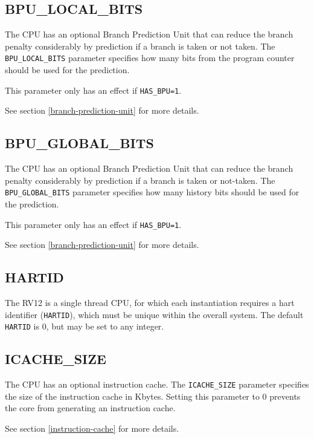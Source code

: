 \subsection{BPU\_LOCAL\_BITS}\label{bpu_local_bits}

The CPU has an optional Branch Prediction Unit that can reduce the
branch penalty considerably by prediction if a branch is taken or not
taken. The \texttt{BPU\_LOCAL\_BITS} parameter specifies how many bits from the
program counter should be used for the prediction.

This parameter only has an effect if \texttt{HAS\_BPU=1}.

See section \ref{branch-prediction-unit}  for more details.

\subsection{BPU\_GLOBAL\_BITS}\label{bpu_global_bits}

The CPU has an optional Branch Prediction Unit that can reduce the
branch penalty considerably by prediction if a branch is taken or
not-taken. The \texttt{BPU\_GLOBAL\_BITS} parameter specifies how many history
bits should be used for the prediction.

This parameter only has an effect if \texttt{HAS\_BPU=1}.

See section \ref{branch-prediction-unit}  for more details.

\subsection{HARTID}\label{hartid}

The RV12 is a single thread CPU, for which each instantiation requires a
hart identifier (\texttt{HARTID}), which must be unique within the overall
system. The default \texttt{HARTID} is 0, but may be set to any integer.

\subsection{ICACHE\_SIZE}\label{icache_size}

The CPU has an optional instruction cache. The \texttt{ICACHE\_SIZE} parameter
specifies the size of the instruction cache in Kbytes. Setting this
parameter to 0 prevents the core from generating an instruction cache.

See section \ref{instruction-cache}  for more details.

